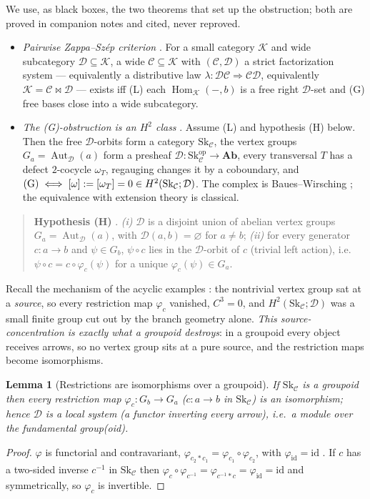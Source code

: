 \documentclass[11pt]{article}
\newtheorem{lemma}[theorem]{Lemma}
\theoremstyle{definition}
\newcommand{\Hom}{\operatorname{Hom}}
\newcommand{\Aut}{\operatorname{Aut}}
\newcommand{\id}{\mathrm{id}}
\newcommand{\C}{\mathcal{C}}
\newcommand{\D}{\mathcal{D}}
\newcommand{\K}{\mathcal{K}}
\newcommand{\Sk}{\mathrm{Sk}}
\newcommand{\Ab}{\mathbf{Ab}}
\begin{document}
We use, as black boxes, the two theorems that set up the obstruction; both are
proved in companion notes and cited, never reproved.

\begin{itemize}
\item[\textbf{(T2)}] \emph{Pairwise Zappa--Sz\'ep criterion} \cite{pairwise,rw}. For a
small category $\K$ and wide subcategory $\D\subseteq\K$, a wide $\C\subseteq\K$
with $(\C,\D)$ a strict factorization system --- equivalently a distributive law
$\lambda:\D\C\Rightarrow\C\D$, equivalently $\K=\C\bowtie\D$ --- exists iff
\textnormal{(L)} each $\Hom_\K(-,b)$ is a free right $\D$-set and \textnormal{(G)}
free bases close into a wide subcategory.
\item[\textbf{(T3)}] \emph{The (G)-obstruction is an $H^2$ class} \cite{gobstr}.
Assume \textnormal{(L)} and hypothesis (H) below. Then the free $\D$-orbits form a
category $\Sk_\C$, the vertex groups $G_a=\Aut_\D(a)$ form a presheaf
$\D:\Sk_\C^{\mathrm{op}}\to\Ab$, every transversal $T$ has a defect $2$-cocycle
$\omega_T$, regauging changes it by a coboundary, and
$\textnormal{(G)}\iff[\omega]:=[\omega_T]=0\in H^2(\Sk_\C;\D)$. The complex is
Baues--Wirsching \cite{bw}; the equivalence with extension theory is
classical.
\end{itemize}

\begin{quote}\small
\textbf{Hypothesis (H)} \cite{gobstr}. \emph{(i)} $\D$ is a disjoint union of
abelian vertex groups $G_a=\Aut_\D(a)$, with $\D(a,b)=\varnothing$ for $a\neq b$;
\emph{(ii)} for every generator $c:a\to b$ and $\psi\in G_b$, $\psi\circ c$ lies in
the $\D$-orbit of $c$ (trivial left action), i.e.\ $\psi\circ c=c\circ\varphi_c(\psi)$
for a unique $\varphi_c(\psi)\in G_a$.
\end{quote}

Recall the mechanism of the acyclic examples \cite{gobstr,orch,supply}: the
nontrivial vertex group sat at a \emph{source}, so every restriction map
$\varphi_c$ vanished, $C^3=0$, and $H^2(\Sk_\C;\D)$ was a small finite group cut
out by the branch geometry alone. \emph{This source-concentration is exactly what a
groupoid destroys}: in a groupoid every object receives arrows, so no vertex group
sits at a pure source, and the restriction maps become isomorphisms.

\begin{lemma}[Restrictions are isomorphisms over a groupoid]\label{lem:iso}
If $\Sk_\C$ is a groupoid then every restriction map $\varphi_c:G_{b}\to G_{a}$
($c:a\to b$ in $\Sk_\C$) is an isomorphism; hence $\D$ is a \emph{local system}
(a functor inverting every arrow), i.e.\ a module over the fundamental group(oid).
\end{lemma}
\begin{proof}
$\varphi$ is functorial and contravariant, $\varphi_{c_2\ast c_1}=\varphi_{c_1}
\circ\varphi_{c_2}$, with $\varphi_{\id}=\id$ \cite[Lem.~skel]{gobstr}. If $c$ has a
two-sided inverse $c^{-1}$ in $\Sk_\C$ then $\varphi_c\circ\varphi_{c^{-1}}
=\varphi_{c^{-1}\ast c}=\varphi_{\id}=\id$ and symmetrically, so $\varphi_c$ is
invertible.
\end{proof}
\end{document}

